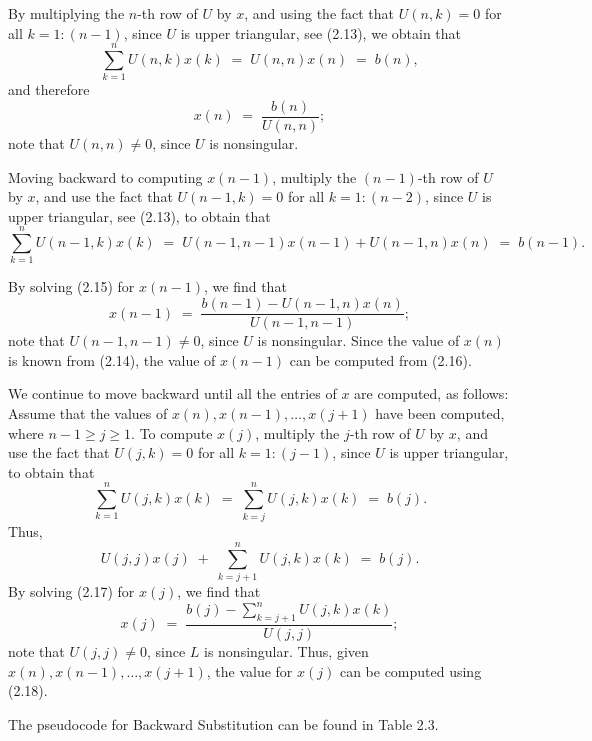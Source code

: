 
By multiplying the $n$-th row of $U$ by $x$, and using the fact that
$U(n,k) = 0$ for all $k = 1:(n-1)$, since $U$ is upper triangular, see
(2.13), we obtain that
\[
\sum_{k=1}^{n} U(n,k)x(k) \;=\; U(n,n)x(n) \;=\; b(n),
\]
and therefore
\begin{equation}
x(n) \;=\; \frac{b(n)}{U(n,n)};
\end{equation}
note that $U(n,n) \neq 0$, since $U$ is nonsingular.

Moving backward to computing $x(n-1)$, multiply the $(n-1)$-th row of $U$
by $x$, and use the fact that $U(n-1,k) = 0$ for all $k = 1:(n-2)$, since
$U$ is upper triangular, see (2.13), to obtain that
\begin{equation}
\sum_{k=1}^{n} U(n-1,k)x(k) \;=\; U(n-1,n-1)x(n-1) + U(n-1,n)x(n) \;=\; b(n-1).
\end{equation}

By solving (2.15) for $x(n-1)$, we find that
\begin{equation}
x(n-1) \;=\; \frac{b(n-1) - U(n-1,n)x(n)}{U(n-1,n-1)};
\end{equation}
note that $U(n-1,n-1) \neq 0$, since $U$ is nonsingular. Since the value
of $x(n)$ is known from (2.14), the value of $x(n-1)$ can be computed
from (2.16).

We continue to move backward until all the entries of $x$ are computed,
as follows: Assume that the values of $x(n), x(n-1), \ldots, x(j+1)$
have been computed, where $n-1 \geq j \geq 1$. To compute $x(j)$,
multiply the $j$-th row of $U$ by $x$, and use the fact that $U(j,k) = 0$
for all $k = 1:(j-1)$, since $U$ is upper triangular, to obtain that
\[
\sum_{k=1}^{n} U(j,k)x(k) \;=\; \sum_{k=j}^{n} U(j,k)x(k) \;=\; b(j).
\]
Thus,
\begin{equation}
U(j,j)x(j) \;+\; \sum_{k=j+1}^{n} U(j,k)x(k) \;=\; b(j).
\end{equation}
By solving (2.17) for $x(j)$, we find that
\begin{equation}
x(j) \;=\; \frac{b(j) - \sum_{k=j+1}^{n} U(j,k)x(k)}{U(j,j)};
\end{equation}
note that $U(j,j) \neq 0$, since $L$ is nonsingular. Thus, given
$x(n), x(n-1), \ldots, x(j+1)$, the value for $x(j)$ can be computed
using (2.18).

The pseudocode for Backward Substitution can be found in Table 2.3.

